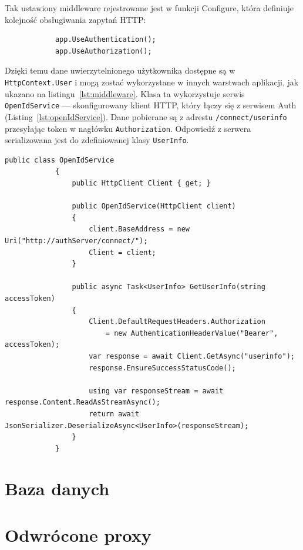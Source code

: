 		Tak ustawiony middleware rejestrowane jest w funkcji Configure, która definiuje kolejność obsługiwania zapytań HTTP:
		\begin{lstlisting}
			app.UseAuthentication();
			app.UseAuthorization();
		\end{lstlisting}
		Dzięki temu dane uwierzytelnionego użytkownika dostępne są w \verb|HttpContext.User| i mogą zostać wykorzystane w innych warstwach aplikacji, jak ukazano na listingu~\ref{lst:middleware}.
		Klasa ta wykorzystuje serwis \verb|OpenIdService| --- skonfigurowany klient HTTP, który łączy się z serwisem Auth (Listing~\ref{lst:openIdService}).
		Dane pobierane są z adrestu \verb|/connect/userinfo| przesyłając token w nagłówku \verb|Authorization|.
		Odpowiedź z serwera serializowana jest do zdefiniowanej klasy \verb|UserInfo|.
		\begin{lstlisting}[label=lst:openIdService, caption=Serwis HTTP pobierający dane użytkownika, float]
			public class OpenIdService
			{
				public HttpClient Client { get; }
		
				public OpenIdService(HttpClient client)
				{
					client.BaseAddress = new Uri("http://authServer/connect/");
					Client = client;
				}
		
				public async Task<UserInfo> GetUserInfo(string accessToken)
				{
					Client.DefaultRequestHeaders.Authorization
						= new AuthenticationHeaderValue("Bearer", accessToken);
					var response = await Client.GetAsync("userinfo");
					response.EnsureSuccessStatusCode();
		
					using var responseStream = await response.Content.ReadAsStreamAsync();
					return await JsonSerializer.DeserializeAsync<UserInfo>(responseStream);
				}
			}
		\end{lstlisting}

\section{Baza danych}
	



\section{Odwrócone proxy}